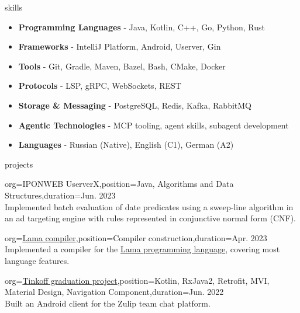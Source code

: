 \documentclass{resume}
\begin{document}
\begin{ResumeSection}{skills}
    \newcommand{\skill}[2]{\textbf{#1} - #2}
        \begin{itemize}
			\item \skill{Programming Languages}{Java, Kotlin, C++, Go, Python, Rust}
            \item \skill{Frameworks}{IntelliJ Platform, Android, Userver, Gin}
            \item \skill{Tools}{Git, Gradle, Maven, Bazel, Bash, CMake, Docker}
            \item \skill{Protocols}{LSP, gRPC, WebSockets, REST}
            \item \skill{Storage \& Messaging}{PostgreSQL, Redis, Kafka, RabbitMQ}
            \item \skill{Agentic Technologies}{MCP tooling, agent skills, subagent development}
            \item \skill{Languages}{Russian (Native), English (C1), German (A2)}
        \end{itemize}
\end{ResumeSection}

\begin{ResumeSection}{projects}
\begin{ResumeSubsection}{org=IPONWEB UserverX,position={Java, Algorithms and Data Structures},duration={Jun. 2023}} \\
Implemented batch evaluation of date predicates using a sweep-line algorithm in an ad targeting engine with rules represented in conjunctive normal form (CNF). \vspace{4pt}

\end{ResumeSubsection}

	\begin{ResumeSubsection}{org=\href{https://github.com/Hardes1/compilers-supplementary}{Lama compiler},position={Compiler construction},duration={Apr. 2023}} \\
	Implemented a compiler for the \href{https://github.com/PLTools/Lama}{Lama programming language}, covering most language features.
 \vspace{4pt}

\end{ResumeSubsection}
	\begin{ResumeSubsection}{org=\href{https://github.com/Hardes1/ZulipClient}{Tinkoff graduation project},position={Kotlin, RxJava2, Retrofit, MVI, Material Design, Navigation Component},duration={Jun. 2022}} \\
Built an Android client for the Zulip team chat platform. \vspace{4pt}
\end{ResumeSubsection}
\end{ResumeSection}
\end{document}
